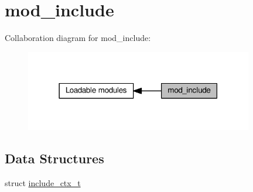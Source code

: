 \hypertarget{group__MOD__INCLUDE}{}\section{mod\+\_\+include}
\label{group__MOD__INCLUDE}
Collaboration diagram for mod\+\_\+include\+:
\nopagebreak
\begin{figure}[H]
\begin{center}
\leavevmode
\includegraphics[width=282pt]{group__MOD__INCLUDE}
\end{center}
\end{figure}
\subsection*{Data Structures}
\begin{DoxyCompactItemize}
\item 
struct \hyperlink{structinclude__ctx__t}{include\+\_\+ctx\+\_\+t}
\end{DoxyCompactItemize}
